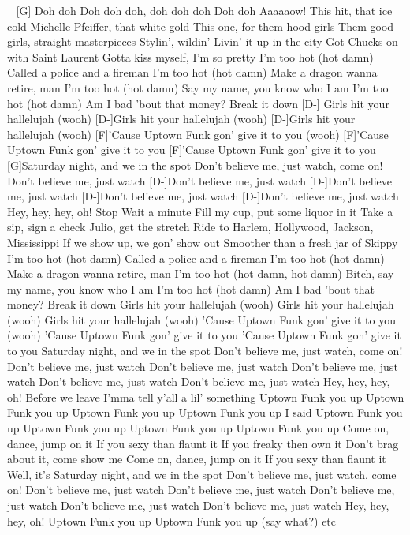 

\begin{guitar}
[D-] ~ [G]
Doh doh
Doh doh doh, doh doh doh
Doh doh
Aaaaaow!
This hit, that ice cold
Michelle Pfeiffer, that white gold
This one, for them hood girls
Them good girls, straight masterpieces
Stylin', wildin'
Livin' it up in the city
Got Chucks on with Saint Laurent
Gotta kiss myself, I'm so pretty
I'm too hot (hot damn)
Called a police and a fireman
I'm too hot (hot damn)
Make a dragon wanna retire, man
I'm too hot (hot damn)
Say my name, you know who I am
I'm too hot (hot damn)
Am I bad 'bout that money?
Break it down
[D-]
Girls hit your hallelujah (wooh)
[D-]Girls hit your hallelujah (wooh)
[D-]Girls hit your hallelujah (wooh)
[F]'Cause Uptown Funk gon' give it to you (wooh)
[F]'Cause Uptown Funk gon' give it to you
[F]'Cause Uptown Funk gon' give it to you
[G]Saturday night, and we in the spot
Don't believe me, just watch, come on!
Don't believe me, just watch
[D-]Don't believe me, just watch
[D-]Don't believe me, just watch
[D-]Don't believe me, just watch
[D-]Don't believe me, just watch
Hey, hey, hey, oh!
Stop
Wait a minute
Fill my cup, put some liquor in it
Take a sip, sign a check
Julio, get the stretch
Ride to Harlem, Hollywood, Jackson, Mississippi
If we show up, we gon' show out
Smoother than a fresh jar of Skippy
I'm too hot (hot damn)
Called a police and a fireman
I'm too hot (hot damn)
Make a dragon wanna retire, man
I'm too hot (hot damn, hot damn)
Bitch, say my name, you know who I am
I'm too hot (hot damn)
Am I bad 'bout that money?
Break it down
Girls hit your hallelujah (wooh)
Girls hit your hallelujah (wooh)
Girls hit your hallelujah (wooh)
'Cause Uptown Funk gon' give it to you (wooh)
'Cause Uptown Funk gon' give it to you
'Cause Uptown Funk gon' give it to you
Saturday night, and we in the spot
Don't believe me, just watch, come on!
Don't believe me, just watch
Don't believe me, just watch
Don't believe me, just watch
Don't believe me, just watch
Don't believe me, just watch
Hey, hey, hey, oh!
Before we leave
I'mma tell y'all a lil' something
Uptown Funk you up
Uptown Funk you up
Uptown Funk you up
Uptown Funk you up
I said Uptown Funk you up
Uptown Funk you up
Uptown Funk you up
Uptown Funk you up
Come on, dance, jump on it
If you sexy than flaunt it
If you freaky then own it
Don't brag about it, come show me
Come on, dance, jump on it
If you sexy than flaunt it
Well, it's Saturday night, and we in the spot
Don't believe me, just watch, come on!
Don't believe me, just watch
Don't believe me, just watch
Don't believe me, just watch
Don't believe me, just watch
Don't believe me, just watch
Hey, hey, hey, oh!
Uptown Funk you up
Uptown Funk you up (say what?) etc
\end{guitar}